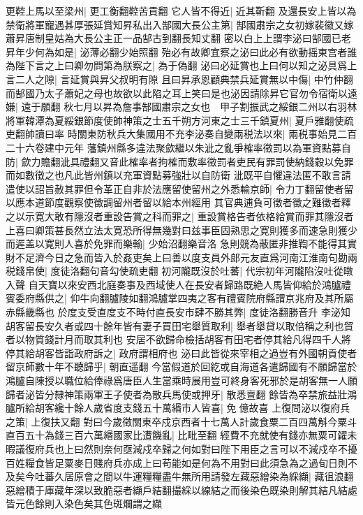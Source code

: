 更鞚上馬以至梁州|{
	更工衡翻鞚苦貢翻}
它人皆不得近|{
	近其靳翻}
及還長安上皆以為禁衛將軍寵遇甚厚張延賞知昇私出入郜國大長公主第|{
	郜國肅宗之女初嫁裴徽又嫁蕭昇唐制皇姑為大長公主正一品郜古到翻長知丈翻}
密以白上上謂李泌曰郜國已老昇年少何為如是|{
	泌薄必翻少始照翻}
殆必有故卿宜察之泌曰此必有欲動摇東宫者誰為陛下言之上曰卿勿問第為朕察之|{
	為于偽翻}
泌曰必延賞也上曰何以知之泌具爲上言二人之隙|{
	言延賞與昇父叔明有隙}
且曰昇承恩顧典禁兵延賞無以中傷|{
	中竹仲翻}
而郜國乃太子蕭妃之母也故欲以此陷之耳上笑曰是也泌因請除昇它官勿令宿衛以遠嫌|{
	遠于願翻}
秋七月以昇為詹事郜國肅宗之女也　甲子割振武之綏銀二州以右羽林將軍韓潭為夏綏銀節度使帥神策之士五千朔方河東之士三千鎮夏州|{
	夏戶雅翻使疏吏翻帥讀曰率}
時關東防秋兵大集國用不充李泌奏自變兩税法以來|{
	兩税事始見二百二十六卷建中元年}
藩鎮州縣多違法聚歛繼以朱泚之亂爭榷率徵罰以為軍資點募自防|{
	歛力贍翻泚具禮翻又音此榷率者拘榷而敷率徵罰者吏民有罪罰使納錢穀以免罪而如數徵之也凡此皆州鎮以充軍資點募強壯以自防衛}
泚既平自懼違法匿不敢言請遣使以詔旨赦其罪但令革正自非於法應留使留州之外悉輸京師|{
	令力丁翻留使者留以應本道節度觀察使徵調留州者留以給本州經用}
其官典逋負可徵者徵之難徵者釋之以示寛大敢有隱沒者重設告賞之科而罪之|{
	重設賞格告者依格給賞而罪其隱沒者}
上喜曰卿策甚長然立法太寛恐所得無幾對曰兹事臣固熟思之寛則獲多而速急則獲少而遲盖以寛則人喜於免罪而樂輸|{
	少始沼翻樂音洛}
急則競為蔽匿非推鞫不能得其實財不足濟今日之急而皆入於姦吏矣上曰善以度支員外郎元友直爲河南江淮南句勘兩税錢帛使|{
	度徒洛翻句音勾使疏吏翻}
初河隴既沒於吐蕃|{
	代宗初年河隴陷沒吐從暾入聲}
自天寶以來安西北庭奏事及西域使人在長安者歸路既絶人馬皆仰給於鴻臚禮賓委府縣供之|{
	仰牛向翻臚陵如翻鴻臚掌四夷之客有禮賓院府縣謂京兆府及其所屬赤縣畿縣也}
於度支受直度支不時付直長安市肆不勝其弊|{
	度徒洛翻勝音升}
李泌知胡客留長安久者或四十餘年皆有妻子買田宅舉質取利|{
	舉者舉貸以取倍稱之利也貿者以物質錢計月而取其利也}
安居不欲歸命檢括胡客有田宅者停其給凡得四千人將停其給胡客皆詣政府訴之|{
	政府謂相府也}
泌曰此皆從來宰相之過豈有外國朝貢使者留京師數十年不聽歸乎|{
	朝直遥翻}
今當假道於回紇或自海道各遣歸國有不願歸當於鴻臚自陳授以職位給俸祿爲唐臣人生當乘時展用豈可終身客死邪於是胡客無一人願歸者泌皆分隸神策兩軍王子使者為散兵馬使或押牙|{
	散悉亶翻}
餘皆為卒禁旅益壯鴻臚所給胡客纔十餘人歲省度支錢五十萬緡市人皆喜|{
	免億故喜}
上復問泌以復府兵之策|{
	上復扶又翻}
對曰今歲徵關東卒戍京西者十七萬人計歲食粟二百四萬斛今粟斗直百五十為錢三百六萬緡國家比遭饑亂|{
	比毗至翻}
經費不充就使有錢亦無粟可糴未暇議復府兵也上曰然則奈何亟減戍卒歸之何如對曰陛下用臣之言可以不減戍卒不擾百姓糧食皆足粟麥日賤府兵亦成上曰苟能如是何為不用對曰此須急為之過旬日則不及矣今吐蕃久居原會之間以牛運糧糧盡牛無所用請發左藏惡繒染為綵纈|{
	藏徂浪翻惡繒積于庫藏年深以致脆惡者纈戶結翻撮綵以線結之而後染色既染則解其結凡結處皆元色餘則入染色矣其色斑爛謂之纈}
